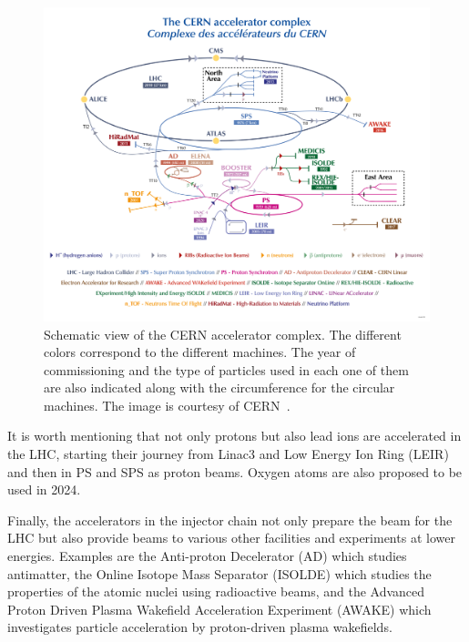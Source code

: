 \begin{figure}[!h] %
    \centering         
    \includegraphics[width=1\textwidth]{images/introduction/cern_accelerator_complex.png}
        \caption{Schematic view of the CERN accelerator complex. The different colors correspond to the different machines. The year of commissioning and the type of particles used in each one of them are also indicated along with the circumference for the circular machines. The image is courtesy of CERN~\cite{Lopienska:2800984}.}
        \label{fig:cern_accelerator_complex}
 \end{figure}

 It is worth mentioning that not only protons but also lead ions are accelerated in the LHC, starting their journey from Linac3 and Low Energy Ion Ring (LEIR) and then in PS and SPS as proton beams. Oxygen atoms are also proposed to be used in 2024.

 Finally, the accelerators in the injector chain not only prepare the beam for the LHC but also provide beams to various other facilities and experiments at lower energies. Examples are the Anti-proton Decelerator (AD) which studies antimatter, the Online Isotope Mass Separator (ISOLDE) which studies the properties of the atomic nuclei using radioactive beams, and the Advanced Proton Driven Plasma Wakefield Acceleration Experiment (AWAKE) which investigates particle acceleration by proton-driven plasma wakefields.

